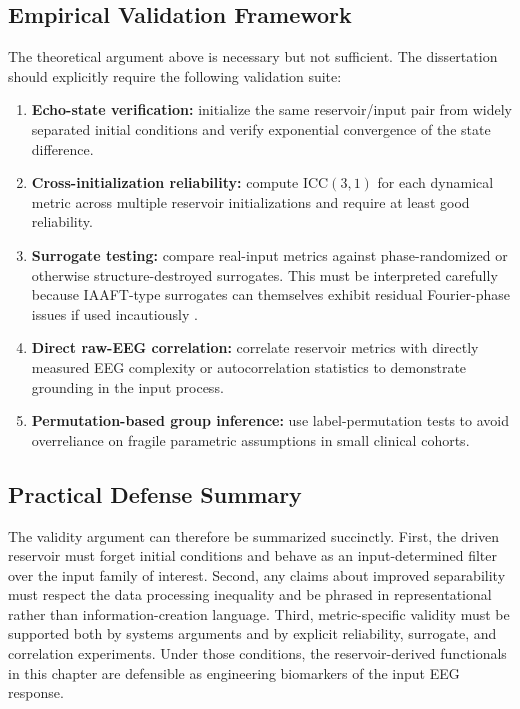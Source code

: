 \subsection{Empirical Validation Framework}

The theoretical argument above is necessary but not sufficient. The dissertation should explicitly require the following validation suite:
\begin{enumerate}
    \item \textbf{Echo-state verification:} initialize the same reservoir/input pair from widely separated initial conditions and verify exponential convergence of the state difference.
    \item \textbf{Cross-initialization reliability:} compute ICC$(3,1)$ for each dynamical metric across multiple reservoir initializations and require at least good reliability.
    \item \textbf{Surrogate testing:} compare real-input metrics against phase-randomized or otherwise structure-destroyed surrogates. This must be interpreted carefully because IAAFT-type surrogates can themselves exhibit residual Fourier-phase issues if used incautiously \cite{rath_revisiting_2012}.
    \item \textbf{Direct raw-EEG correlation:} correlate reservoir metrics with directly measured EEG complexity or autocorrelation statistics to demonstrate grounding in the input process.
    \item \textbf{Permutation-based group inference:} use label-permutation tests to avoid overreliance on fragile parametric assumptions in small clinical cohorts.
\end{enumerate}

\subsection{Practical Defense Summary}

The validity argument can therefore be summarized succinctly. First, the driven reservoir must forget initial conditions and behave as an input-determined filter over the input family of interest. Second, any claims about improved separability must respect the data processing inequality and be phrased in representational rather than information-creation language. Third, metric-specific validity must be supported both by systems arguments and by explicit reliability, surrogate, and correlation experiments. Under those conditions, the reservoir-derived functionals in this chapter are defensible as engineering biomarkers of the input EEG response.

